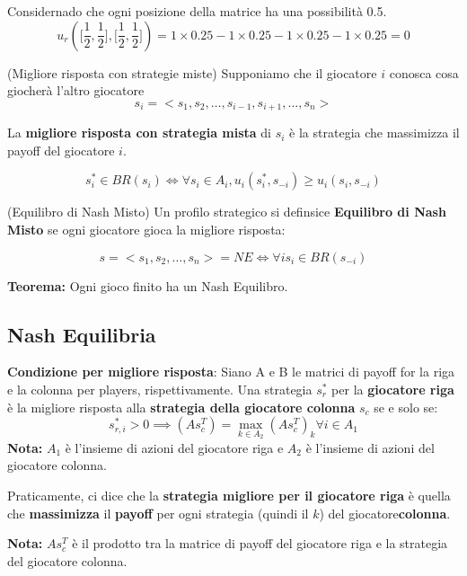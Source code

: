 Considernado che ogni posizione della matrice ha una possibilità 0.5.
\[
    u_r(\big[\frac{1}{2}, \frac{1}{2}\big], \big[\frac{1}{2}, \frac{1}{2}\big]) = 1 \times 0.25 - 1 \times 0.25 - 1 \times 0.25 - 1 \times 0.25 = 0 \]

\begin{definition}(Migliore risposta con strategie miste)
    Supponiamo che il giocatore $i$ conosca cosa giocherà l'altro giocatore
    \[
        s_i = <s_1, s_2, \dots, s_{i-1}, s_{i+1}, \dots, s_n>
    \]

    La \textbf{migliore risposta con strategia mista} di $s_i$ è la strategia che
    massimizza il payoff del giocatore $i$.

    \[
        s_i^* \in BR(s_i) \iff \forall s_i \in A_i, u_i(s_i^*,s_{-i}) \geq u_i(s_i, s_{-i})
    \]
\end{definition}

\begin{definition}(Equilibro di Nash Misto)
    Un profilo strategico si definsice \textbf{Equilibro di Nash Misto} se ogni giocatore gioca la migliore risposta:

    \[
        s = <s_1, s_2, \dots, s_n> = NE \iff \forall i s_i \in BR(s_{-i})
    \]

    \textbf{Teorema:} Ogni gioco finito ha un Nash Equilibro.
\end{definition}

\subsection{Nash Equilibria}

\textbf{Condizione per migliore risposta}: Siano A e B le matrici di payoff for la riga e la colonna per players, rispettivamente.
Una strategia $s_r^*$ per la \textbf{giocatore riga} è la migliore risposta alla\textbf{ strategia della giocatore colonna} $s_c$ se e solo se:
\[
    s_{r,i}^* > 0 \implies (As_c^T) = \max_{k\in A_2}(As_c^T)_k \forall i \in A_1
\]
\textbf{Nota:} $A_1$ è l'insieme di azioni del giocatore riga e $A_2$ è l'insieme di azioni del giocatore colonna.

Praticamente, ci dice che la \textbf{strategia migliore per il giocatore riga}
è quella che \textbf{massimizza} il \textbf{payoff} per ogni strategia (quindi
il $k$) del giocatore\textbf{colonna}.

\textbf{Nota:} $As_c^T$ è il prodotto tra la matrice di payoff del giocatore riga e la strategia del giocatore colonna.

